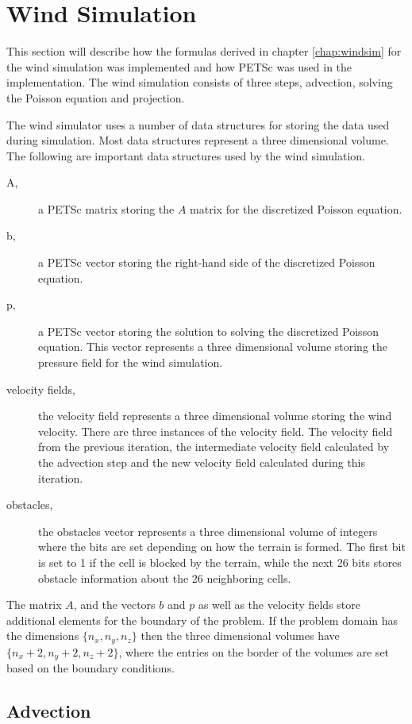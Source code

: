 \section{Wind Simulation}

This section will describe how the formulas derived in chapter \ref{chap:windsim}
for the wind simulation was implemented and how PETSc was used in the
implementation. The wind simulation consists of three steps, advection, solving
the Poisson equation and projection. 

The wind simulator uses a number of data structures for storing the data used
during simulation. Most data structures represent a three dimensional volume.
The following are important data structures used by the wind simulation.
\begin{description}
	\item[A,] a PETSc matrix storing the $A$ matrix for the discretized Poisson
		equation.
	\item[b,] a PETSc vector storing the right-hand side of the discretized
		Poisson equation.
	\item[p,] a PETSc vector storing the solution to solving the discretized
		Poisson equation. This vector represents a three dimensional volume
		storing the pressure field for the wind simulation.
	\item[velocity fields,] the velocity field represents a three dimensional
		volume storing the wind velocity. There are three instances of the velocity
		field. The velocity field from the previous iteration, the intermediate
		velocity field calculated by the advection step and the new velocity
		field calculated during this iteration.
	\item[obstacles,] the obstacles vector represents a three dimensional volume
		of integers where the bits are set depending on how the terrain is
		formed. The first bit is set to 1 if the cell is blocked by the terrain,
		while the next 26 bits stores obstacle information about the 26
		neighboring cells.
\end{description}
The matrix $A$, and the vectors $b$ and $p$ as well as the velocity fields store
additional elements for the boundary of the problem. If the problem domain has
the dimensions $\{ n_x, n_y, n_z \}$ then the three dimensional volumes have
$\{ n_x+2, n_y+2, n_z+2 \}$, where the entries on the border of the volumes are
set based on the boundary conditions.

\subsection{Advection}

